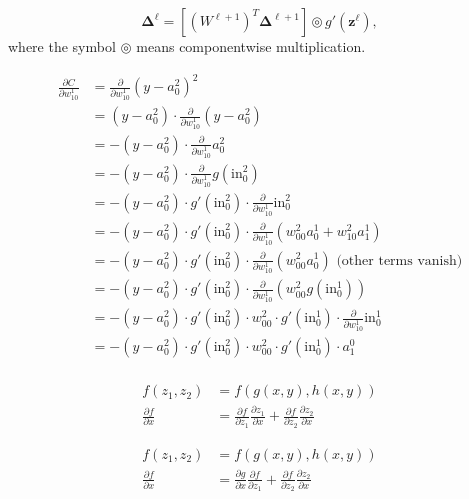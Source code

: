 \documentclass{article}
\newcommand{\vc}[1]{\boldsymbol{#1}}
\begin{document}
    \begin{equation}
        \vc\Delta^\ell = \left[ (W^{\ell +1})^T \vc\Delta^{\ell +1} \right] \circledcirc g'(\vc z^\ell), 
    \end{equation}
    where the symbol $\circledcirc$ means componentwise multiplication.



    \def\inn{\text{in}}
    \begin{align*}
        \frac{\partial C}{\partial w_{10}^1} 
        &= \frac{\partial}{\partial w_{10}^1} (y-a_0^2)^2 \\
        &= (y-a_0^2)\cdot \frac{\partial}{\partial w_{10}^1} (y-a_0^2) \\
        &= -(y-a_0^2)\cdot \frac{\partial}{\partial w_{10}^1} a_0^2 \\
        &= -(y-a_0^2)\cdot \frac{\partial}{\partial w_{10}^1} g(\inn_0^2) \\
        &= -(y-a_0^2)\cdot g'(\inn_0^2) \cdot \frac{\partial}{\partial w_{10}^1} \inn_0^2 \\
        &= -(y-a_0^2)\cdot g'(\inn_0^2) \cdot \frac{\partial}{\partial w_{10}^1} 
        (w_{00}^2a_0^1 + w_{10}^2 a_1^1)  \\
        &= -(y-a_0^2)\cdot g'(\inn_0^2) \cdot \frac{\partial}{\partial w_{10}^1} 
        (w_{00}^2a_0^1)  \text{ (other terms vanish)}\\
        &= -(y-a_0^2)\cdot g'(\inn_0^2) \cdot \frac{\partial}{\partial w_{10}^1} 
        (w_{00}^2 g(\inn_0^1))  \\
        &= -(y-a_0^2)\cdot g'(\inn_0^2) \cdot w_{00}^2 \cdot 
        g'(\inn_0^1) \cdot \frac{\partial}{\partial w_{10}^1} \inn_0^1 \\
        &= -(y-a_0^2)\cdot g'(\inn_0^2) \cdot w_{00}^2 \cdot 
        g'(\inn_0^1) \cdot a_1^0 \\
    \end{align*}

    \begin{align*}
        f(z_1,z_2) &= f(g(x,y), h(x,y))\\
        \frac{\partial f}{\partial x} 
        &= \frac{\partial f}{\partial z_1}\frac{\partial z_1}{\partial x} +  \frac{\partial f}{\partial z_2}\frac{\partial z_2}{\partial x}
    \end{align*}

    \begin{align*}
        f(z_1,z_2) &= f(g(x,y), h(x,y))\\
        \frac{\partial f}{\partial x} 
        &= \frac{\partial g}{\partial x}\frac{\partial f}{\partial z_1} +  \frac{\partial f}{\partial z_2}\frac{\partial z_2}{\partial x}
    \end{align*}
\end{document}
